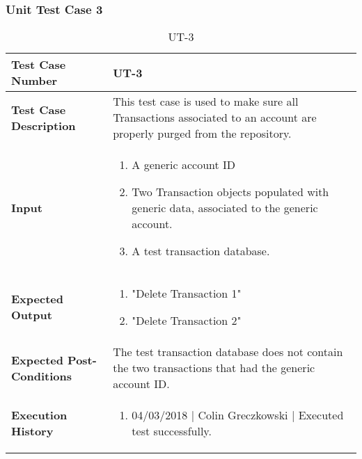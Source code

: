 \documentclass[12pt]{article}
\begin{document}
\subsubsection{Unit Test Case 3} \label{tc:3}
\def\arraystretch{1.5}%
\begin{table}[htbp]
\centering
\caption {UT-3}
\label{UT-3}
\begin{tabularx}{\textwidth}{ | l | X |}
\hline
\textbf{Test Case Number}      &  UT-3                         \\ \hline
\textbf{Test Case Description}    &  This test case is used to make sure all Transactions associated to an account are properly purged from the repository.                \\ \hline
\textbf{Input}         & 	\begin{enumerate}
          \item A generic account ID
	\item Two Transaction objects populated with generic data, associated to the generic account.
	\item A test transaction database.
\end{enumerate} \\ \hline

\textbf{Expected Output}     & \begin{enumerate}
	\item "Delete Transaction 1"
           \item "Delete Transaction 2"
\end{enumerate} \\ \hline
\textbf{Expected Post-Conditions}           & The test transaction database does not contain the two transactions that had the generic account ID.                \\ \hline
\textbf{Execution History}   &  \begin{enumerate}
	\item 04/03/2018 | Colin Greczkowski | Executed test successfully.
\end {enumerate} \\ \hline
\end{tabularx}
\end{table}
\clearpage
\end{document}
